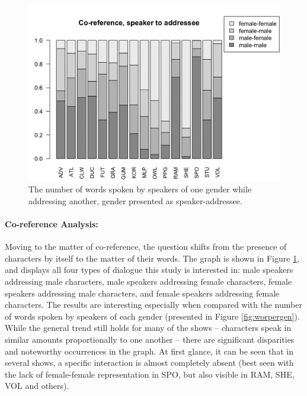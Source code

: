 \documentclass[a4paper, 11pt]{article}
\begin{document}
\begin{figure}[t!]
  \includegraphics[width=\linewidth]{figures/coreference.png}
  \caption{The number of words spoken by speakers of one gender while addressing another, gender presented as speaker-addressee.}
  \label{fig:coreference}
\end{figure}

\paragraph{Co-reference Analysis:}
Moving to the matter of co-reference, the question shifts from the presence of characters by itself to the matter of their words. The graph is shown in Figure \ref{fig:coreference}, and displays all four types of dialogue this study is interested in: male speakers addressing male characters, male speakers addressing female characters, female speakers addressing male characters, and female speakers addressing female characters. The results are interesting especially when compared with the number of words spoken by speakers of each gender (presented in Figure \ref{fig:worpergen}). While the general trend still holds for many of the shows -- characters speak in similar amounts proportionally to one another -- there are significant disparities and noteworthy occurrences in the graph. At first glance, it can be seen that in several shows, a specific interaction is almost completely absent (best seen with the lack of female-female representation in SPO, but also visible in RAM, SHE, VOL and others).
\end{document}
